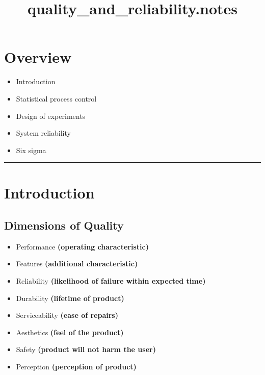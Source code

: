 \documentclass[11pt]{article}
\title{quality\_and\_reliability.notes}
\providecommand{\tightlist}{%
      \setlength{\itemsep}{0pt}\setlength{\parskip}{0pt}}
\begin{document}
    
    
    \maketitle
    
    

    
    \hypertarget{overview}{%
\section{Overview}\label{overview}}

\begin{itemize}
\tightlist
\item
  Introduction
\item
  Statistical process control
\item
  Design of experiments
\item
  System reliability
\item
  Six sigma
\end{itemize}

\begin{center}\rule{0.5\linewidth}{\linethickness}\end{center}

    \hypertarget{introduction}{%
\section{Introduction}\label{introduction}}

\hypertarget{dimensions-of-quality}{%
\subsection{Dimensions of Quality}\label{dimensions-of-quality}}

\begin{itemize}
\tightlist
\item
  Performance \textbf{(operating characteristic)}
\item
  Features \textbf{(additional characteristic)}
\item
  Reliability \textbf{(likelihood of failure within expected time)}
\item
  Durability \textbf{(lifetime of product)}
\item
  Serviceability \textbf{(ease of repairs)}
\item
  Aesthetics \textbf{(feel of the product)}
\item
  Safety \textbf{(product will not harm the user)}
\item
  Perception \textbf{(perception of product)}
\end{itemize}
\end{document}

